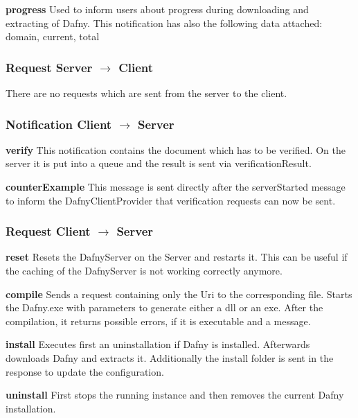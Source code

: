 \textbf{progress}
Used to inform users about progress during downloading and extracting of Dafny. This notification has also the following data attached: domain, current, total\newline

\subsubsection{Request Server $\longrightarrow$ Client}
There are no requests which are sent from the server to the client. 

\subsubsection{Notification Client $\longrightarrow$ Server}

\textbf{verify}
This notification contains the document which has to be verified. On the server it is put into a queue and the result is sent via verificationResult. \newline

\textbf{counterExample}
This message is sent directly after the serverStarted message to inform the DafnyClientProvider that verification requests can now be sent. \newline


\subsubsection{Request Client $\longrightarrow$ Server}

\textbf{reset}
Resets the DafnyServer on the Server and restarts it. This can be useful if the caching of the DafnyServer is not working correctly anymore. \newline

\textbf{compile}
Sends a request containing only the Uri to the corresponding file. Starts the Dafny.exe with parameters to generate either a dll or an exe. After the compilation, it returns possible errors, if it is executable and a message.\newline

\textbf{install}
Executes first an uninstallation if Dafny is installed. Afterwards downloads Dafny and extracts it. Additionally the install folder is sent in the response to update the configuration. \newline

\textbf{uninstall}
First stops the running instance and then removes the current Dafny installation. \newline

